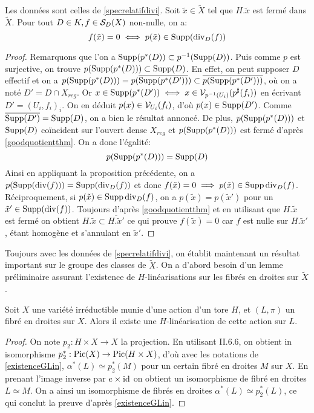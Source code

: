 \begin{cor}\label{zerosspecrelatif}
Les données sont celles de \ref{specrelatifdivi}. Soit $\tilde{x}\in\widetilde{X}$ tel que $H.\tilde{x}$ est fermé dans $\widetilde{X}$. Pour tout $D\in K, f\in \mathcal{S}_D(X)$ non-nulle, on a:
$$f(\tilde{x})=0 \iff p(\tilde{x})\in \operatorname{Supp}(\operatorname{div}_D(f))$$
\end{cor}
\begin{proof}
Remarquons que l'on a $\operatorname{Supp}(p^*(D))\subset p^{-1}(\operatorname{Supp}(D))$. Puis comme $p$ est surjective, on trouve $p(\operatorname{Supp}(p^*(D)))\subset \operatorname{Supp}(D)$. En effet, on peut supposer $D$ effectif et on a $p(\operatorname{Supp}(p^*(D)))=p(\overline{\operatorname{Supp}(p^*(D'))})\subset\overline{p(\operatorname{Supp}(p^*(D')))}$, où on a noté $D'=D\cap X_{reg}$. Or $x\in \operatorname{Supp}(p^*(D'))\iff x\in \mathcal{V}_{p^{-1}(U_i)}(p^\sharp(f_i))$ en écrivant $D'=(U_i,f_i)_i$. On en déduit $p(x)\in \mathcal{V}_{U_i}(f_i)$, d'où $p(x)\in\operatorname{Supp}(D')$. Comme $\overline{\operatorname{Supp}(D')}=\operatorname{Supp}(D)$, on a bien le résultat annoncé. De plus, $p(\operatorname{Supp}(p^*(D)))$ et $\operatorname{Supp}(D)$ coïncident sur l'ouvert dense $X_{reg}$ et $p(\operatorname{Supp}(p^*(D)))$ est fermé d'après \ref{goodquotientthm}. On a donc l'égalité:$$p(\operatorname{Supp}(p^*(D)))=\operatorname{Supp}(D)$$
Ainsi en appliquant la proposition précédente, on a $p(\operatorname{Supp}(\operatorname{div}(f)))= \operatorname{Supp}(\operatorname{div}_D(f))$ et donc $f(\tilde{x})=0 \implies p(\tilde{x})\in\operatorname{Supp} \operatorname{div}_D(f)$. Réciproquement, si $p(\tilde{x})\in\operatorname{Supp} \operatorname{div}_D(f)$, on a $p(\tilde{x})=p(\tilde{x}')$ pour un $\tilde{x}'\in \operatorname{Supp}(\operatorname{div}(f))$. Toujours d'après \ref{goodquotientthm} et en utilisant que $H.\tilde{x}$ est fermé on obtient $H.\tilde{x}\subset\overline{H.\tilde{x}'}$ ce qui prouve $f(\tilde{x})=0$ car $f$ est nulle sur $H.\tilde{x}'$, étant homogène et s'annulant en $\tilde{x}'$.
\end{proof}

Toujours avec les données de \ref{specrelatifdivi}, on établit maintenant un résultat important sur le groupe des classes de $\widetilde{X}$. On a d'abord besoin d'un lemme préliminaire assurant l'existence de $H$-linéarisations sur les fibrés en droites sur $\widetilde{X}$.

\begin{lem}\label{existenceGLinTore}
Soit $X$ une variété irréductible munie d'une action d'un tore $H$, et $(L,\pi)$ un fibré en droites sur $X$. Alors il existe une $H$-linéarisation de cette action sur $L$.
\end{lem}
\begin{proof}
On note $p_2:H\times X\rightarrow X$ la projection. En utilisant \cite{Hartshorne} II.6.6, on obtient in isomorphisme $p_2^*:\operatorname{Pic}(X)\rightarrow \operatorname{Pic}(H\times X)$, d'où avec les notations de \ref{existenceGLin}, $\alpha^*(L)\simeq p_2^*(M)$ pour un certain fibré en droites $M$ sur $X$. En prenant l'image inverse par $e\times \operatorname{id}$ on obtient un isomorphisme de fibré en droites $L\simeq M$. On a ainsi un isomorphisme de fibrés en droites $\alpha^*(L)\simeq p_2^*(L)$, ce qui conclut la preuve d'après \ref{existenceGLin}.
\end{proof}


